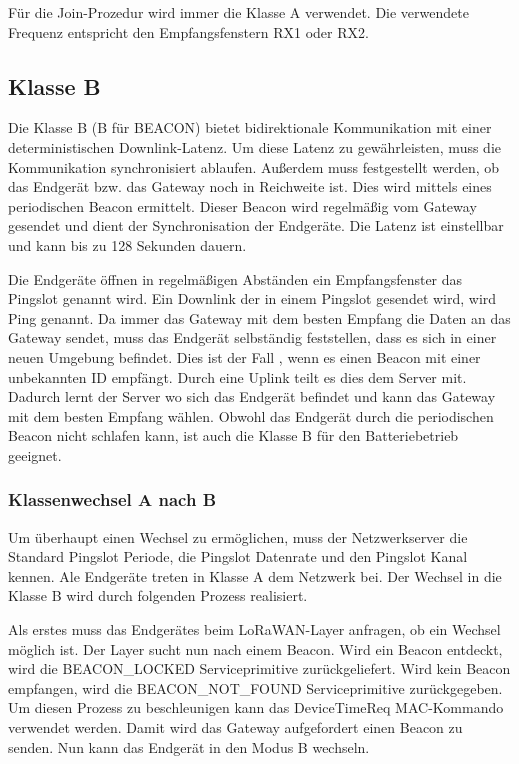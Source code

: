 \documentclass[a4paper, 12pt]{article}
\begin{document}
            Für die Join-Prozedur wird immer die Klasse A verwendet. Die verwendete Frequenz entspricht den 
            Empfangsfenstern RX1 oder RX2.
        \subsection{Klasse B}
            Die Klasse B (B für BEACON) bietet bidirektionale Kommunikation mit einer deterministischen Downlink-Latenz.
            Um diese Latenz zu gewährleisten, muss die Kommunikation synchronisiert ablaufen. Außerdem muss 
            festgestellt werden, ob das Endgerät bzw. das Gateway noch in Reichweite ist. Dies wird mittels eines 
            periodischen Beacon ermittelt. Dieser Beacon wird regelmäßig vom Gateway gesendet und dient der 
            Synchronisation der Endgeräte. Die Latenz ist einstellbar und kann 
            bis zu 128 Sekunden dauern.\cite[S.66 ff.]{LoRaSpec}

            Die Endgeräte öffnen in regelmäßigen Abständen ein Empfangsfenster das Pingslot genannt wird. Ein Downlink 
            der in einem Pingslot gesendet wird, wird Ping genannt. Da immer das Gateway mit dem besten Empfang die 
            Daten an das Gateway sendet, muss das Endgerät selbständig feststellen, dass es sich in einer neuen Umgebung befindet.
            Dies ist der Fall , wenn es einen Beacon mit einer unbekannten ID empfängt. Durch eine Uplink teilt es dies 
            dem Server mit. 
            Dadurch lernt der Server wo sich das Endgerät befindet und kann das Gateway mit dem besten Empfang wählen.
            Obwohl das Endgerät durch die periodischen Beacon nicht schlafen kann, ist auch die Klasse B für den 
            Batteriebetrieb geeignet.

            \subsubsection{Klassenwechsel A nach B}
                Um überhaupt einen Wechsel zu ermöglichen, muss der Netzwerkserver die Standard Pingslot Periode, die 
                Pingslot Datenrate und den Pingslot Kanal kennen. Ale Endgeräte treten in Klasse A dem Netzwerk bei. 
                Der Wechsel in die Klasse B wird durch folgenden Prozess realisiert.

                Als erstes muss das Endgerätes beim LoRaWAN-Layer anfragen, ob ein Wechsel möglich ist. 
                Der Layer sucht nun nach einem Beacon. Wird ein Beacon entdeckt, wird die BEACON\_LOCKED 
                Serviceprimitive 
                zurückgeliefert. Wird kein Beacon empfangen, wird die BEACON\_NOT\_FOUND Serviceprimitive 
                zurückgegeben. Um diesen Prozess zu beschleunigen kann das DeviceTimeReq 
                MAC-Kommando verwendet werden. Damit wird das Gateway aufgefordert einen Beacon zu senden. Nun kann 
                das Endgerät in den Modus B wechseln.
\end{document}
